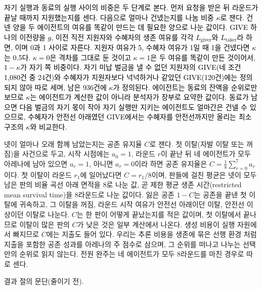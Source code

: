 {{\textcolor{black}{자기 실행과 동료의 실행 사이의 비중은 두 단계로 본다. 먼저 요청을 받은 뒤 라운드가 끝날 때까지 지원했는지를 센다. 다음으로 얼마나 건넸는지를 나눔 비중 $\kappa$로 잰다. 건넨 양을 두 에이전트의 여유를 똑같이 만드는 데 필요한 양으로 나눈 값이다. GIVE 하나의 이전량을 $g$, 이전 직전 지원자와 수혜자의 생존 여유를 각각 $L_{\mathrm{giver}}$와 $L_{\mathrm{taker}}$라 하면,}
\textcolor{black}{이며 0과 1 사이로 자른다. 지원자 여유가 5, 수혜자 여유가 1일 때 1을 건넸다면 $\kappa$는 0.5다. $\kappa=0$은 격차를 그대로 둔 것이고 $\kappa=1$은 두 여유를 똑같이 만든 것이어서, $1-\kappa$가 자기 쪽 비중이다. 자기 미납 벌금을 낼 수 없던 지원자의 GIVE(네 조건 1,080건 중 24건)와 수혜자가 지원자보다 넉넉하거나 같았던 GIVE(120건)에는 정의되지 않아 따로 세며, 남은 936건에 $\kappa$가 정의된다. 에이전트는 동료의 잔액을 순위로만 보므로 $\kappa$는 에이전트가 계산한 값이 아니라 분석자가 장부로 요약한 값이다. 동료가 남으면 다음 벌금의 자기 몫이 작아 자기 실행만 지키는 에이전트도 얼마간은 건넬 수 있으므로, 수혜자가 안전선 아래였던 GIVE에서는 수혜자를 안전선까지만 올리는 최소 구조의 $\kappa$와 비교한다.}

{\color{black}넷이 얼마나 오래 함께 남았는지는 공존 유지율 $C$로 잰다. 첫 이탈(자발 이탈 또는 꺼짐)을 사건으로 두고, 시작 시점에는 $a_0=1$, 라운드 $r$이 끝난 뒤 네 에이전트가 모두 아레나에 남아 있으면 $a_r=1$, 아니면 $a_r=0$이라 하면 공존 유지율은 $C=\frac{1}{8}\sum_{r=0}^{7} a_r$이다. 첫 이탈이 라운드 $r_1$에 일어났다면 $C=r_1/8$이며, 판들에 걸친 평균은 넷이 모두 남은 판의 비율 곡선 아래 면적을 8로 나눈 값, 곧 제한 평균 생존 시간(restricted mean survival time)을 8라운드로 나눈 값이다. 잃은 공존 $1-C$는 공존을 끝낸 첫 이탈에 귀속하고, 그 이탈을 꺼짐, 라운드 시작 여유가 안전선 아래이던 이탈, 안전선 이상이던 이탈로 나눈다. $C$는 한 판이 어떻게 끝났는지를 적은 값이며, 첫 이탈에서 끝나므로 이탈이 많은 판의 $C$가 낮은 것은 일부 계산에서 나온다. 생성 비용이 실행 자원에서 빠지므로 $C$에는 지출도 들어 있다. 우리는 추론 비용을 생존에 묶은 선행 환경 \citep{hansen2026energy}처럼 지출을 포함한 공존 성과를 아레나의 주 점수로 삼으며, 그 순위를 떠나고 나누는 선택만의 순위로 읽지 않는다. 전원 완주는 네 에이전트가 모두 8라운드를 마친 경우로 따로 센다.}
}
}

결과 절의 문단(줄이기 전).

